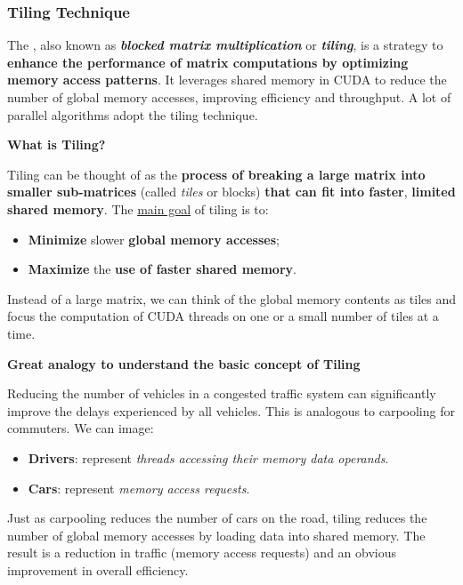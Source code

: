 \subsubsection{Tiling Technique}

The , also known as \textbf{\emph{blocked matrix multiplication}} or \textbf{\emph{tiling}}, is a strategy to \textbf{enhance the performance of matrix computations by optimizing memory access patterns}. It leverages shared memory in CUDA to reduce the number of global memory accesses, improving efficiency and throughput. A lot of parallel algorithms adopt the tiling technique.

\highspace
\begin{flushleft}
    \textcolor{Green3}{ \textbf{What is Tiling?}}
\end{flushleft}
Tiling can be thought of as the \textbf{process of breaking a large matrix into smaller sub-matrices} (called \emph{tiles} or blocks) \textbf{that can fit into faster}, \textbf{limited shared memory}. The \underline{main goal} of tiling is to:
\begin{itemize}
    \item \textbf{Minimize} slower \textbf{global memory accesses};
    \item \textbf{Maximize} the \textbf{use of faster shared memory}.
\end{itemize}
Instead of a large matrix, we can think of the global memory contents as tiles and focus the computation of CUDA threads on one or a small number of tiles at a time.

\highspace
\begin{flushleft}
    \textcolor{Green3}{ \textbf{Great analogy to understand the basic concept of Tiling}}
\end{flushleft}
Reducing the number of vehicles in a congested traffic system can significantly improve the delays experienced by all vehicles. This is analogous to carpooling for commuters. We can image:
\begin{itemize}
    \item \textbf{Drivers}: represent \emph{threads accessing their memory data operands}.
    \item \textbf{Cars}: represent \emph{memory access requests}.
\end{itemize}
Just as carpooling reduces the number of cars on the road, tiling reduces the number of global memory accesses by loading data into shared memory. The result is a reduction in traffic (memory access requests) and an obvious improvement in overall efficiency.

